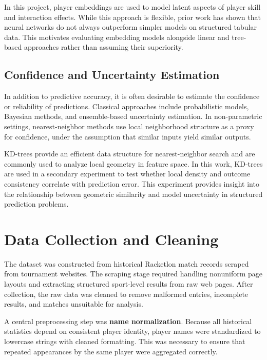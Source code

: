 \documentclass[10pt,twocolumn]{article}
\begin{document}
In this project, player embeddings are used to model latent aspects of player skill and interaction effects. While this approach is flexible, prior work has shown that neural networks do not always outperform simpler models on structured tabular data. This motivates evaluating embedding models alongside linear and tree-based approaches rather than assuming their superiority.

\subsection{Confidence and Uncertainty Estimation}

In addition to predictive accuracy, it is often desirable to estimate the confidence or reliability of predictions. Classical approaches include probabilistic models, Bayesian methods, and ensemble-based uncertainty estimation. In non-parametric settings, nearest-neighbor methods \citep{cover1967} use local neighborhood structure as a proxy for confidence, under the assumption that similar inputs yield similar outputs.

KD-trees \citep{bentley1975} provide an efficient data structure for nearest-neighbor search and are commonly used to analyze local geometry in feature space. In this work, KD-trees are used in a secondary experiment to test whether local density and outcome consistency correlate with prediction error. This experiment provides insight into the relationship between geometric similarity and model uncertainty in structured prediction problems.

\section{Data Collection and Cleaning}

The dataset was constructed from historical Racketlon match records scraped from tournament websites. The scraping stage required handling nonuniform page layouts and extracting structured sport-level results from raw web pages. After collection, the raw data was cleaned to remove malformed entries, incomplete results, and matches unsuitable for analysis.

A central preprocessing step was \textbf{name normalization}. Because all historical statistics depend on consistent player identity, player names were standardized to lowercase strings with cleaned formatting. This was necessary to ensure that repeated appearances by the same player were aggregated correctly.
\end{document}
